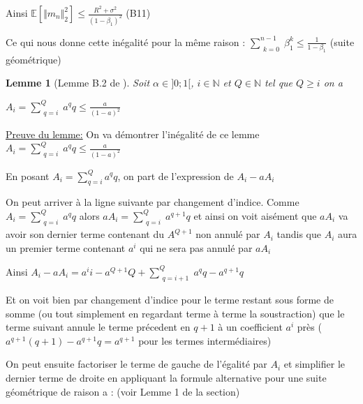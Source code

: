 \documentclass{article}
\newtheorem{lemma}{Lemme}
\begin{document}
\bigskip

Ainsi $\mathbb{E}[\Vert m_n \Vert _2^2] \leq \frac{R^2+\sigma^2}{(1-\beta_1)^2}$ \hspace{\fill}(B11) 

\bigskip

Ce qui nous donne cette inégalité pour la même raison : $\sum\limits_{\substack {k=0}}^{n-1} \beta_1^k \leq \frac{1}{1-\beta_1}$ (suite géométrique)

\bigskip

\begin{lemma}[Lemme B.2 de \cite{defossez2022a}]

\bigskip

Soit $\alpha \in ]0;1[$, $i \in \mathbb{N}$ et $Q\in \mathbb{N}$ tel que $Q\geq i$ on a

\bigskip

$A_i=\sum\limits_{\substack {q=i}}^{Q} a^q q \leq \frac{a}{(1-a)^2}$
\end{lemma}

\bigskip

\bigskip

\underline{Preuve du lemme:} On va démontrer l'inégalité de ce lemme $A_i=\sum\limits_{\substack {q=i}}^{Q} a^q q \leq \frac{a}{(1-a)^2}$

\bigskip

En posant $A_i=\sum_{q=i}^{Q} a^q q$, on part de l'expression de $A_i-a A_i$

\bigskip

On peut arriver à la ligne suivante par changement d'indice. Comme  $A_i=\sum\limits_{\substack {q=i}}^{Q} a^q q$ alors  $aA_i=\sum\limits_{\substack {q=i}}^{Q} a^{q+1} q$ et ainsi on voit aisément que $aA_i$ va avoir son dernier terme contenant du $A^{Q+1}$ non annulé par $A_i$ tandis que $A_i$ aura un premier terme contenant $a^i$ qui ne sera pas annulé par $aA_i$

\bigskip

Ainsi $A_i-a A_i= a^i i -a^{Q+1}Q + \sum\limits_{\substack {q=i+1}}^{Q} a^q q- a^{q+1} q$ 

\bigskip

Et on voit bien par changement d'indice pour le terme restant sous forme de somme (ou tout simplement en regardant terme à terme la soustraction) que le terme suivant annule le terme précedent en $q+1$ à un coefficient $a^i$ près ($a^{q+1} (q+1) - a^{q+1} q=a^{q+1}$ pour les termes intermédiaires)

\bigskip

On peut ensuite factoriser le terme de gauche de l'égalité par $A_i$ et simplifier le dernier terme de droite en appliquant la formule alternative pour une suite géométrique de raison a : (voir Lemme 1 de la section)
\end{document}

